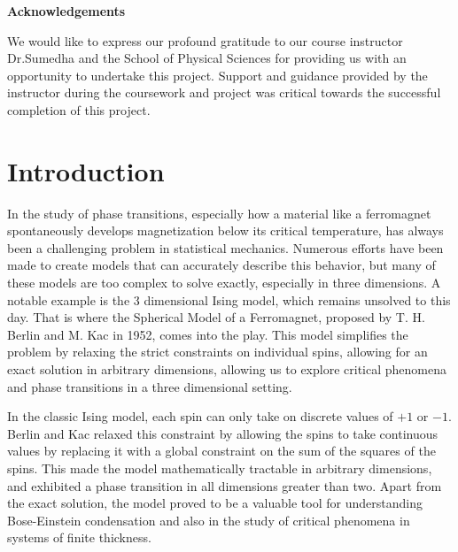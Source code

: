 \documentclass{article}
\begin{document}
\cleardoublepage
\begin{center}
    \Large{\textbf{Acknowledgements}}
\end{center}

\vspace{0.2in}

We would like to express our profound gratitude to our course instructor Dr.Sumedha and the School of Physical Sciences for providing us with an opportunity to undertake this project. Support and guidance provided by the instructor during the coursework and project was critical towards the successful completion of this project.

\newpage
\restoregeometry


\begin{abstract}

\end{abstract}
\restoregeometry



\newpage
\tableofcontents



\newpage

\section{Introduction}

In the study of phase transitions, especially how a material like a ferromagnet spontaneously develops magnetization below its critical temperature, has always been a challenging problem in statistical mechanics. Numerous efforts have been made to create models that can accurately describe this behavior, but many of these models are too complex to solve exactly, especially in three dimensions. A notable example is the 3 dimensional Ising model, which remains unsolved to this day.
That is where the Spherical Model of a Ferromagnet\cite{Foundational}, proposed by T. H. Berlin and M. Kac in 1952, comes into the play. This model simplifies the problem by relaxing the strict constraints on individual spins, allowing for an exact solution in arbitrary dimensions, allowing us to explore critical phenomena and phase transitions in a three dimensional setting.

In the classic Ising model, each spin can only take on discrete values of $+1$ or $-1$. Berlin and Kac relaxed this constraint by allowing the spins to take continuous values by replacing it with a global constraint on the sum of the squares of the spins. This made the model mathematically tractable in arbitrary dimensions, and exhibited a phase transition in all dimensions greater than two. 
Apart from the exact solution, the model proved to be a valuable tool for understanding Bose-Einstein condensation\cite{BECanalogy} and also in the study of critical phenomena in systems of finite thickness\cite{finitethickness}. 
\end{document}
